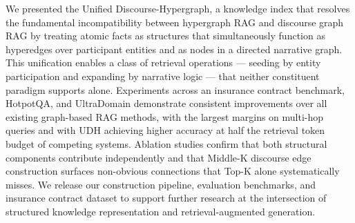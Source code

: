 \documentclass[runningheads]{llncs}
\begin{document}
We presented the Unified Discourse-Hypergraph, a knowledge index that resolves the fundamental incompatibility between hypergraph RAG and discourse graph RAG by treating atomic facts as structures that simultaneously function as hyperedges over participant entities and as nodes in a directed narrative graph. This unification enables a class of retrieval operations — seeding by entity participation and expanding by narrative logic — that neither constituent paradigm supports alone. Experiments across an insurance contract benchmark, HotpotQA, and UltraDomain demonstrate consistent improvements over all existing graph-based RAG methods, with the largest margins on multi-hop queries and with UDH achieving higher accuracy at half the retrieval token budget of competing systems. Ablation studies confirm that both structural components contribute independently and that Middle-K discourse edge construction surfaces non-obvious connections that Top-K alone systematically misses. We release our construction pipeline, evaluation benchmarks, and insurance contract dataset to support further research at the intersection of structured knowledge representation and retrieval-augmented generation.





























\end{document}
